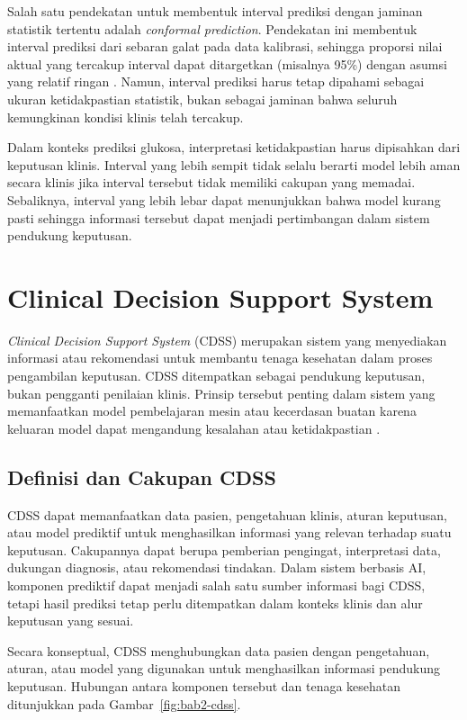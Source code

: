 Salah satu pendekatan untuk membentuk interval prediksi dengan jaminan statistik tertentu adalah \textit{conformal prediction}. Pendekatan ini membentuk interval prediksi dari
sebaran galat pada data kalibrasi, sehingga proporsi nilai aktual yang tercakup interval dapat ditargetkan (misalnya 95\%) dengan asumsi yang relatif ringan
\parencite{angelopoulos2021}. 
Namun, interval prediksi harus tetap dipahami sebagai ukuran ketidakpastian statistik, bukan sebagai jaminan bahwa seluruh kemungkinan kondisi klinis telah tercakup.

Dalam konteks prediksi glukosa, interpretasi ketidakpastian harus dipisahkan dari keputusan klinis. Interval yang lebih sempit tidak selalu berarti model lebih aman secara 
klinis jika interval tersebut tidak memiliki cakupan yang memadai. Sebaliknya, interval yang lebih lebar dapat menunjukkan bahwa model kurang pasti sehingga informasi tersebut 
dapat menjadi pertimbangan dalam sistem pendukung keputusan.

\section{Clinical Decision Support System}
\label{sec:bab2-cdss}

\textit{Clinical Decision Support System} (CDSS) merupakan sistem yang menyediakan informasi atau rekomendasi untuk membantu tenaga kesehatan dalam proses pengambilan keputusan. 
CDSS ditempatkan sebagai pendukung keputusan, bukan pengganti penilaian klinis. Prinsip tersebut penting dalam sistem yang memanfaatkan model pembelajaran mesin atau kecerdasan 
buatan karena keluaran model dapat mengandung kesalahan atau ketidakpastian \parencite{sutton2020}.

\subsection{Definisi dan Cakupan CDSS}
\label{subsec:bab2-definisi-cdss}

CDSS dapat memanfaatkan data pasien, pengetahuan klinis, aturan keputusan, atau model prediktif untuk menghasilkan informasi yang relevan terhadap suatu keputusan. Cakupannya
dapat berupa pemberian pengingat, interpretasi data, dukungan diagnosis, atau rekomendasi tindakan. Dalam sistem berbasis AI, komponen prediktif dapat menjadi salah satu sumber
informasi bagi CDSS, tetapi hasil prediksi tetap perlu ditempatkan dalam konteks klinis dan alur keputusan yang sesuai.

Secara konseptual, CDSS menghubungkan data pasien dengan pengetahuan, aturan, atau model yang digunakan untuk menghasilkan informasi pendukung keputusan. Hubungan antara komponen tersebut dan tenaga kesehatan
ditunjukkan pada Gambar~\ref{fig:bab2-cdss}.

